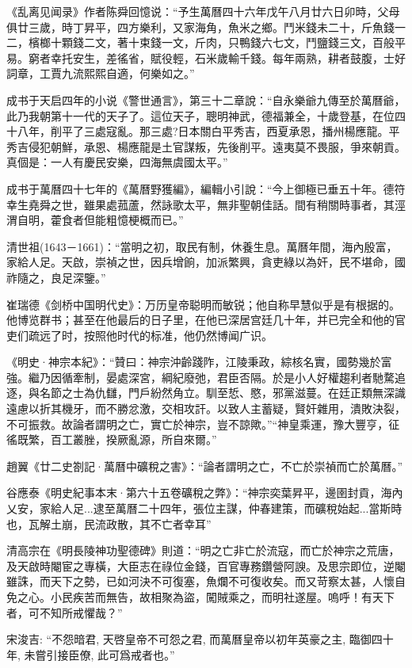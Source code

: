 《乱离见闻录》作者陈舜回憶说：“予生萬曆四十六年戊午八月廿六日卯時，父母俱廿三歲，時丁昇平，四方樂利，又家海角，魚米之鄉。鬥米錢未二十，斤魚錢一二，檳榔十顆錢二文，著十束錢一文，斤肉，只鴨錢六七文，鬥鹽錢三文，百般平易。窮者幸托安生，差徭省，賦役輕，石米歲輸千錢。每年兩熟，耕者鼓腹，士好詞章，工賈九流熙熙自適，何樂如之。”

成书于天启四年的小说《警世通言》，第三十二章說：“自永樂爺九傳至於萬曆爺，此乃我朝第十一代的天子了。這位天子，聰明神武，德福兼全，十歲登基，在位四十八年，削平了三處寇亂。那三處?日本關白平秀吉，西夏承恩，播州楊應龍。平秀吉侵犯朝鮮，承恩、楊應龍是土官謀叛，先後削平。遠夷莫不畏服，爭來朝貢。真個是：一人有慶民安樂，四海無虞國太平。”

成书于萬曆四十七年的《萬曆野獲編》，編輯小引說：“今上御極已垂五十年。德符幸生堯舜之世，雖果處菰蘆，然詠歌太平，無非聖朝佳話。間有稍關時事者，其涇渭自明，藿食者但能粗憶梗概而已。”

清世祖(1643－1661)：“當明之初，取民有制，休養生息。萬曆年間，海內殷富，家給人足。天啟，崇禎之世，因兵增餉，加派繁興，貪吏綠以為奸，民不堪命，國祚隨之，良足深鑒。”

崔瑞德《剑桥中国明代史》：万历皇帝聪明而敏锐；他自称早慧似乎是有根据的。他博览群书；甚至在他最后的日子里，在他已深居宫廷几十年，并已完全和他的官吏们疏远了时，按照他时代的标准，他仍然博闻广识。

《明史·神宗本紀》：“贊曰：神宗沖齡踐阼，江陵秉政，綜核名實，國勢幾於富強。繼乃因循牽制，晏處深宮，綱紀廢弛，君臣否隔。於是小人好權趨利者馳騖追逐，與名節之士為仇讎，門戶紛然角立。馴至悊、愍，邪黨滋蔓。在廷正類無深識遠慮以折其機牙，而不勝忿激，交相攻訐。以致人主蓄疑，賢奸雜用，潰敗決裂，不可振救。故論者謂明之亡，實亡於神宗，豈不諒歟。”“神皇乘運，豫大豐亨，征徭既繁，百工叢脞，揆厥亂源，所自來爾。”

趙翼《廿二史劄記·萬曆中礦稅之害》：“論者謂明之亡，不亡於崇禎而亡於萬曆。”

谷應泰《明史紀事本末·第六十五卷礦稅之弊》：“神宗奕葉昇平，邊圉封貢，海內乂安，家給人足...逮至萬曆二十四年，張位主謀，仲春建策，而礦稅始起...當斯時也，瓦解土崩，民流政散，其不亡者幸耳”

清高宗在《明長陵神功聖德碑》則道：“明之亡非亡於流寇，而亡於神宗之荒唐，及天啟時閹宦之專橫，大臣志在祿位金錢，百官專務鑽營阿諛。及思宗即位，逆閹雖誅，而天下之勢，已如河決不可復塞，魚爛不可復收矣。而又苛察太甚，人懷自免之心。小民疾苦而無告，故相聚為盜，闖賊乘之，而明社遂屋。嗚呼！有天下者，可不知所戒懼哉？”

宋浚吉: “不怨暗君, 天啓皇帝不可怨之君, 而萬曆皇帝以初年英豪之主, 臨御四十年, 未嘗引接臣僚, 此可爲戒者也。”

